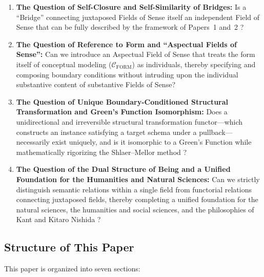 \documentclass[11pt,a4paper]{article}
\theoremstyle{definition}
\theoremstyle{plain}
\theoremstyle{remark}
\newcommand{\CFORM}{\mathcal{C}_{\mathrm{FORM}}}
\begin{document}
\begin{enumerate}
    \item \textbf{The Question of Self-Closure and Self-Similarity of Bridges:} Is a ``Bridge'' connecting juxtaposed Fields of Sense itself an independent Field of Sense that can be fully described by the framework of Papers~1 and~2 \cite{ota2026paper1,ota2026paper2}?
    \item \textbf{The Question of Reference to Form and ``Aspectual Fields of Sense'':} Can we introduce an Aspectual Field of Sense that treats the form itself of conceptual modeling ($\CFORM$) as individuals, thereby specifying and composing boundary conditions without intruding upon the individual substantive content of substantive Fields of Sense?
    \item \textbf{The Question of Unique Boundary-Conditioned Structural Transformation and Green's Function Isomorphism:} Does a unidirectional and irreversible structural transformation functor---which constructs an instance satisfying a target schema under a pullback---necessarily exist uniquely, and is it isomorphic to a Green's Function while mathematically rigorizing the Shlaer--Mellor method \cite{shlaer1992,mellor2002}?
    \item \textbf{The Question of the Dual Structure of Being and a Unified Foundation for the Humanities and Natural Sciences:} Can we strictly distinguish semantic relations within a single field from functorial relations connecting juxtaposed fields, thereby completing a unified foundation for the natural sciences, the humanities and social sciences, and the philosophies of Kant \cite{kant1781} and Kitaro Nishida \cite{nishida1911,nishida1927}?
\end{enumerate}

\subsection{Structure of This Paper}
This paper is organized into seven sections:
\end{document}
